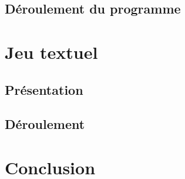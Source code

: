 \documentclass[11pt]{article}
\begin{document}
\subsection{Déroulement du programme}
\label{sec:orgd24ac8f}

\section{Jeu textuel}
\label{sec:org175ec1e}

\subsection{Présentation}
\label{sec:org297c481}

\subsection{Déroulement}
\label{sec:org833ae36}

\section{Conclusion}
\label{sec:org41a3cac}
\end{document}
